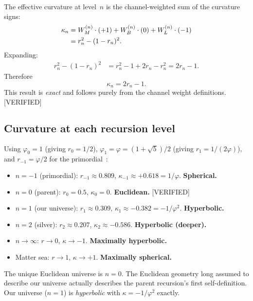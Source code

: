 \documentclass[prd,twocolumn,preprintnumbers,amsmath,amssymb]{revtex4-2}
\newcommand{\verified}{\textcolor{green!60!black}{[VERIFIED]}}
\newcommand{\phig}{\varphi}
\newcommand{\WL}{W_{L}}
\newcommand{\WB}{W_{B}}
\newcommand{\WM}{W_{M}}
\begin{document}
The effective curvature at level~$n$ is the channel-weighted sum of the
curvature signs:
\begin{align}
  \kappa_n &= \WM^{(n)}\cdot(+1) + \WB^{(n)}\cdot(0) + \WL^{(n)}\cdot(-1) \notag\\
           &= r_n^2 - (1-r_n)^2. \label{eq:kn_raw}
\end{align}
Expanding:
\begin{align}
  r_n^2 - (1-r_n)^2 &= r_n^2 - 1 + 2r_n - r_n^2 = 2r_n - 1. \label{eq:kn_derive}
\end{align}
Therefore
\begin{equation}
  \boxed{\kappa_n = 2r_n - 1.}
  \label{eq:kn}
\end{equation}
This result is \emph{exact} and follows purely from the channel weight
definitions.  \verified

\subsection{Curvature at each recursion level}

Using $\phig_0=1$ (giving $r_0=1/2$), $\phig_1 = \phig = (1+\sqrt{5})/2$
(giving $r_1 = 1/(2\phig)$), and $r_{-1} = \phig/2$ for the primordial~\cite{Shields2026parent}:

\begin{itemize}
  \item $n=-1$ (primordial): $r_{-1}\approx0.809$,
        $\kappa_{-1}\approx+0.618=1/\phig$. \quad\textbf{Spherical.}
  \item $n=0$ (parent): $r_0=0.5$,
        $\kappa_0=0$. \quad\textbf{Euclidean.}  \verified
  \item $n=1$ (our universe): $r_1\approx0.309$,
        $\kappa_1\approx-0.382=-1/\phig^2$. \quad\textbf{Hyperbolic.}
  \item $n=2$ (silver): $r_2\approx0.207$,
        $\kappa_2\approx-0.586$. \quad\textbf{Hyperbolic (deeper).}
  \item $n\to\infty$: $r\to0$, $\kappa\to-1$. \quad\textbf{Maximally hyperbolic.}
  \item Matter sea: $r\to1$, $\kappa\to+1$. \quad\textbf{Maximally spherical.}
\end{itemize}

The unique Euclidean universe is $n=0$.  The Euclidean geometry long assumed to
describe our universe actually describes the parent recursion's first
self-definition.  Our universe ($n=1$) is \emph{hyperbolic} with $\kappa =
-1/\phig^2$ exactly.
\end{document}
